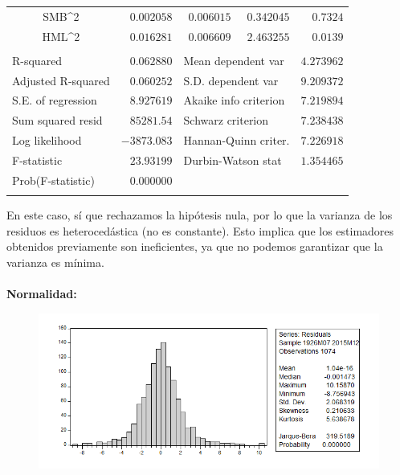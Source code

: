 \documentclass[12pt]{article}
\numberwithin{equation}{section} %
\begin{document}
\begin{table}[H]
\begin{tabular}{lrrrr}
\multicolumn{1}{c}{SMB\textasciicircum 2}&\multicolumn{1}{r}{$0.002058$}&\multicolumn{1}{r}{$0.006015$}&\multicolumn{1}{r}{$0.342045$}&\multicolumn{1}{r}{$0.7324$}\\
\multicolumn{1}{c}{HML\textasciicircum 2}&\multicolumn{1}{r}{$0.016281$}&\multicolumn{1}{r}{$0.006609$}&\multicolumn{1}{r}{$2.463255$}&\multicolumn{1}{r}{$0.0139$}\\
[4.5pt] \hline \\ [-4.5pt]
\multicolumn{1}{l}{R-squared}&\multicolumn{1}{r}{$0.062880$}&\multicolumn{2}{l}{Mean dependent var}&\multicolumn{1}{r}{$4.273962$}\\
\multicolumn{1}{l}{Adjusted R-squared}&\multicolumn{1}{r}{$0.060252$}&\multicolumn{2}{l}{S.D. dependent var}&\multicolumn{1}{r}{$9.209372$}\\
\multicolumn{1}{l}{S.E. of regression}&\multicolumn{1}{r}{$8.927619$}&\multicolumn{2}{l}{Akaike info criterion}&\multicolumn{1}{r}{$7.219894$}\\
\multicolumn{1}{l}{Sum squared resid}&\multicolumn{1}{r}{$85281.54$}&\multicolumn{2}{l}{Schwarz criterion}&\multicolumn{1}{r}{$7.238438$}\\
\multicolumn{1}{l}{Log likelihood}&\multicolumn{1}{r}{$-3873.083$}&\multicolumn{2}{l}{Hannan-Quinn criter.}&\multicolumn{1}{r}{$7.226918$}\\
\multicolumn{1}{l}{F-statistic}&\multicolumn{1}{r}{$23.93199$}&\multicolumn{2}{l}{Durbin-Watson stat}&\multicolumn{1}{r}{$1.354465$}\\
\multicolumn{1}{l}{Prob(F-statistic)}&\multicolumn{1}{r}{$0.000000$}&\multicolumn{1}{c}{}&\multicolumn{1}{c}{}&\multicolumn{1}{c}{}\\
[4.5pt] \hline \\ [-4.5pt]
\end{tabular}
\end{table}

En este caso, sí que rechazamos la hipótesis nula, por lo que la varianza de los residuos es heterocedástica (no es constante). Esto implica que los estimadores obtenidos previamente son ineficientes, ya que no podemos garantizar que la varianza es mínima.
\\
\\
\noindent \textbf{Normalidad:}

\begin{figure}[H]
\centering
\includegraphics[]{hist.png}
\end{figure}
\end{document}
